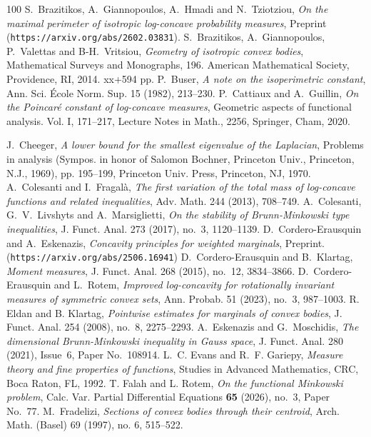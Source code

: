 \documentclass[11pt,leqno]{article}
\theoremstyle{definition}
\theoremstyle{remark}
\numberwithin{equation}{section}
\newcommand{\1}{\textbf{1}}
\begin{document}
\begin{thebibliography}{100}
 \textrm{S.\ Brazitikos, A.\ Giannopoulos, A.\ Hmadi and N.\ Tziotziou}, \textit{On the maximal perimeter of isotropic log-concave probability measures}, 
Preprint ({\tt https://arxiv.org/abs/2602.03831}).
 \textrm{S.\ Brazitikos, A.\ Giannopoulos, P.\ Valettas and B-H.\ Vritsiou}, \textit{Geometry of isotropic
convex bodies}, Mathematical Surveys and Monographs, 196. American Mathematical Society, Providence, RI, 2014. xx+594 pp.
 \textrm{P.\ Buser}, \textit{A note on the isoperimetric constant}, Ann. Sci. \'{E}cole Norm. Sup.
{15} (1982), 213--230.
 \textrm{P.\ Cattiaux and A.\ Guillin}, \textit{On the Poincar\'{e} constant of log-concave measures}, 
Geometric aspects of functional analysis. Vol. I, 171--217, Lecture Notes in Math., 2256, Springer, Cham, 2020.


 \textrm{J.\ Cheeger}, \textit{A lower bound for the smallest eigenvalue of the Laplacian},
Problems in analysis (Sympos. in honor of Salomon Bochner, Princeton Univ., Princeton, N.J., 1969), pp. 195--199, Princeton Univ. Press, Princeton, NJ, 1970.
 \textrm{A.\ Colesanti and I.\ Fragal\`{a}}, \textit{The first variation of the total mass of log-concave functions and related inequalities},
Adv. Math. 244 (2013), 708--749.
 \textrm{A.\ Colesanti, G.~V.\ Livshyts and A.\ Marsiglietti}, \textit{On the stability of Brunn-Minkowski type inequalities}, J. Funct. Anal. 273 (2017), no.~3, 1120--1139.
 \textrm{D.\ Cordero-Erausquin and A.\ Eskenazis}, \textit{Concavity principles for weighted marginals}, Preprint.\\
({\tt https://arxiv.org/abs/2506.16941})
 \textrm{D.\ Cordero-Erausquin and B.\ Klartag}, \textit{Moment measures}, J. Funct. Anal. 268 (2015), no.~12, 3834--3866.
 \textrm{D.\ Cordero-Erausquin and L.\ Rotem}, \textit{Improved log-concavity for rotationally invariant measures of symmetric 
convex sets}, Ann. Probab. 51 (2023), no.~3, 987--1003. 
 \textrm{R. Eldan and B. Klartag}, \textit{Pointwise estimates for marginals of convex bodies}, J. Funct. Anal.  254 (2008), no.~8, 2275--2293.
 \textrm{A.~Eskenazis and G.~Moschidis}, \textit{The dimensional Brunn-Minkowski inequality in
Gauss space}, J. Funct. Anal. 280 (2021), Issue~6, Paper No.~108914.
 \textrm{L.~C. Evans and R.~F. Gariepy}, \textit{Measure theory and fine properties of functions}, Studies in Advanced Mathematics, CRC, Boca Raton, FL, 1992.
 \textrm{T. Falah and L. Rotem}, \textit{On the functional Minkowski problem}, Calc. Var. Partial Differential Equations {\bf 65} (2026), no.~3, Paper No.~77.
 \textrm{M.\ Fradelizi}, \textit{Sections of convex bodies through their centroid},
Arch. Math. (Basel) {69} (1997), no. 6, 515--522.


\end{thebibliography}
\end{document}
